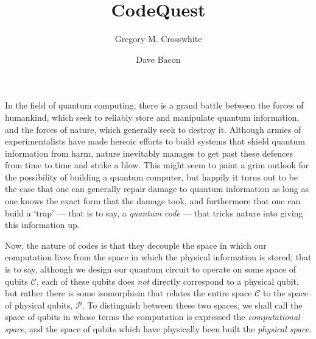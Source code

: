 \documentclass[twocolumn,showpacs,preprintnumbers,amsmath,amssymb,nofootinbib,pra,floatfix]{revtex4-1}
\begin{document}
\title{CodeQuest}

\author{Gregory M. Crosswhite}

\author{Dave Bacon}




\maketitle

\newpage

\tableofcontents
In the field of quantum computing, there is a grand battle between the
forces of humankind, which seek to reliably store and manipulate
quantum information, and the forces of nature, which generally seek to
destroy it.  Although armies of experimentalists have made hereoic
efforts to build systems that shield quantum information from harm,
nature inevitably manages to get past these defences from time to time
and strike a blow.  This might seem to paint a grim outlook for the
possibility of building a quantum computer, but happily it turns out
to be the case that one can generally repair damage to quantum
information as long as one knows the exact form that the damage took,
and furthermore that one can build a `trap' --- that is to say, a
\emph{quantum code} --- that tricks nature into giving this
information up.

Now, the nature of codes is that they decouple the space in which our
computation lives from the space in which the physical information is
stored; that is to say, although we design our quantum circuit to
operate on some space of qubits $\mathscr{C}$, each of these qubits
does \emph{not} directly correspond to a physical qubit, but rather
there is some isomorphism that relates the entire space $\mathscr{C}$
to the space of physical qubits, $\mathscr{P}$.  To distinguish
between these two spaces, we shall call the space of qubits in whose
terms the computation is expressed the \emph{computational space}, and
the space of qubits which have physically been built the
\emph{physical space}.
\end{document}
